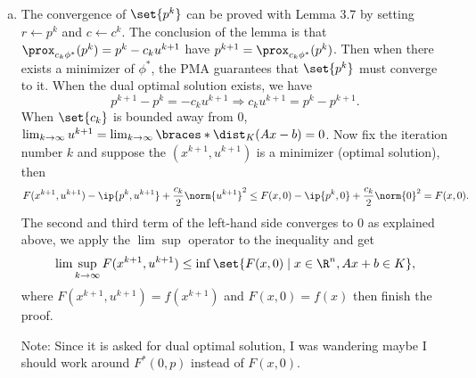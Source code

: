 \documentclass{article}
\theoremstyle{plain}
\theoremstyle{definition}
\theoremstyle{remark}
\begin{document}
\begin{solution}
\begin{enumerate}[(a)]
{\begin{align*}
            \end{align*}
            The inner minimization is achieved.
            The $p^{k+1} = \proj_{K^*}\parens*{p^k+c_k\parens*{Ax^{k+1}-b}}$ is proved with Q2d.
        }
        \item The convergence of $\set{p^k}$ can be proved with Lemma 3.7 by setting $r\leftarrow p^k$ and $c\leftarrow c^k$. The conclusion of the lemma is that $\prox_{c_k\phi^*}(p^k)=p^k-c_ku^{k+1}$ have $p^{k+1}=\prox_{c_k\phi^*}(p^k)$. Then when there exists a minimizer of $\phi^*$, the PMA guarantees that $\set{p^k}$ must converge to it. When the dual optimal solution exists, we have
        \[p^{k+1}-p^k=-c_ku^{k+1}\Rightarrow c_ku^{k+1}=p^k-p^{k+1}.\]
        When $\set{c_k}$ is bounded away from $0$, $\lim_{k\rightarrow\infty}u^{k+1}=\lim_{k\rightarrow\infty}\braces*{\dist_K(Ax-b)}=0$. Now fix the iteration number $k$ and suppose the $(x^{k+1},u^{k+1})$ is a minimizer (optimal solution), then
        \[F(x^{k+1}, u^{k+1})-\ip{p^k, u^{k+1}}+\frac{c_k}{2}\norm{u^{k+1}}^2\leq F(x, 0)-\ip{p^k, 0}+\frac{c_k}{2}\norm{0}^2=F(x,0).\]
        The second and third term of the left-hand side converges to $0$ as explained above, we apply the $\lim\sup$ operator to the inequality and get
        \[\lim\sup_{k\rightarrow\infty}F(x^{k+1},u^{k+1})\leq\inf\set{F(x,0)\mid x\in\R^n, Ax+b\in K},\]
        where $F(x^{k+1},u^{k+1})=f(x^{k+1})$ and $F(x,0)=f(x)$ then finish the proof.

        Note: Since it is asked for dual optimal solution, I was wandering maybe I should work around $F^*(0,p)$ instead of $F(x,0)$.
    \end{enumerate}
\end{solution}
\end{document}

